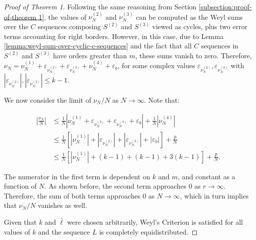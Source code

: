 \documentclass[11pt,a4paper]{tesis}
\theoremstyle{plain}
\theoremstyle{definition}
\begin{document}
\begin{proof}[Proof of Theorem 1]
  Following the same reasoning from Section \ref{subsection:proof-of-theorem 1}, the values of $\nu_N^{(2)}$ and $\nu_N^{(3)}$ can be computed as the Weyl sums over the $C$ sequences composing $S^{(2)}$ and $S^{(3)}$ viewed as cycles, plus two error terms accounting for right borders. However, in this case, due to Lemma \ref{lemma:weyl-sum-over-cyclic-c-sequences} and the fact that all $C$ sequences in $S^{(2)}$ and $S^{(3)}$ have orders greater than $m$, these sums vanish to zero. Therefore, $\nu_N = \nu^{(1)}_N + \varepsilon_{\nu^{(2)}_N} + \varepsilon_{\nu^{(3)}_N} + \nu^{(4)}_N + \varepsilon_b$, for some complex values $\varepsilon_{\nu^{(2)}_N}, \varepsilon_{\nu^{(3)}_N}$ with $|\varepsilon_{\nu^{(2)}_N}|, |\varepsilon_{\nu^{(3)}_N}| \le k - 1$.

  We now consider the limit of $\nu_N / N$ as $N \to \infty$. Note that:

  \begin{equation*}
    \begin{aligned}
      \left| \frac{\nu_N}{N} \right|
        & \le \frac{1}{N} \left| \nu^{(1)}_N + \varepsilon_{\nu^{(2)}_N} + \varepsilon_{\nu^{(3)}_N} + \varepsilon_b \right| + \frac{1}{N} \left| \nu^{(4)}_N \right| \\
        & \le \frac{1}{N} \left[ \left| \nu^{(1)}_N \right| + | \varepsilon_{\nu^{(2)}_N} | + | \varepsilon_{\nu^{(3)}_N} | + \left| \varepsilon_b \right| \right] + \frac{p}{N} \\
        & \le \frac{1}{N} \left[ \left| \nu^{(1)}_N \right| + (k - 1) + (k - 1) + 3 (k - 1) \right] + \frac{p}{N} \text{.}
    \end{aligned}
  \end{equation*}

  The numerator in the first term is dependent on $k$ and $m$, and constant as a function of $N$. As shown before, the second term approaches $0$ as $r \to \infty$. Therefore, the sum of both terms approaches $0$ as $N \to \infty$, which in turn implies that $\nu_N / N$ vanishes as well.

  Given that $k$ and $\bar{\ell}$ were chosen arbitrarily, Weyl's Criterion is satisfied for all values of $k$ and the sequence $L$ is completely equidistributed.

\end{proof}

\backmatter


\end{document}
